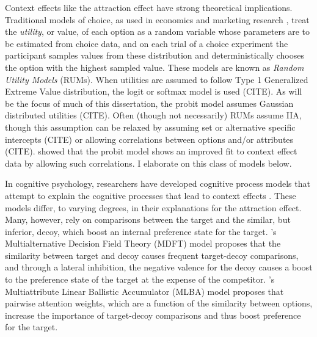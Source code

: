 \documentclass{umassthesis}          %
\begin{document}
Context effects like the attraction effect have strong theoretical implications. Traditional models of choice, as used in economics and marketing research \parencite{mcfadden2001economic}, treat the \textit{utility}, or value, of each option as a random variable whose parameters are to be estimated from choice data, and on each trial of a choice experiment the participant samples values from these distribution and deterministically chooses the option with the highest sampled value. These models are known as \textit{Random Utility Models} (RUMs). When utilities are assumed to follow Type 1 Generalized Extreme Value distribution, the logit or softmax model is used (CITE). As will be the focus of much of this dissertation, the probit model assumes Gaussian distributed utilities (CITE). Often (though not necessarily) RUMs assume IIA, though this assumption can be relaxed by assuming set or alternative specific intercepts (CITE) or allowing correlations between options and/or attributes (CITE). \textcite{haaijer1998utility} showed that the probit model shows an improved fit to context effect data by allowing such correlations. I elaborate on this class of models below. 

In cognitive psychology, researchers have developed cognitive process models that attempt to explain the cognitive processes that lead to context effects \parencite{truebloodMultiattributeLinearBallistic,roeMultialternativeDecisionField2001a,usherLossAversionInhibition2004a,bhatiaAssociationsAccumulationPreference2013b,noguchiMultialternativeDecisionSampling2018a,wollschlager2NaryChoiceTree2012a,bergnerVAMPVotingAgent2019b,tverskyEliminationAspectsTheory1972,tversky1993context}. These models differ, to varying degrees, in their explanations for the attraction effect. Many, however, rely on comparisons between the target and the similar, but inferior, decoy, which boost an internal  preference state for the target. \textcite{roeMultialternativeDecisionField2001a}'s Multialternative Decision Field Theory (MDFT) model proposes that the similarity between target and decoy causes frequent target-decoy comparisons, and through a lateral inhibition, the negative valence for the decoy causes a boost to the preference state of the target at the expense of the competitor. \textcite{truebloodMultiattributeLinearBallistic}'s Multiattribute Linear Ballistic Accumulator (MLBA) model proposes that pairwise attention weights, which are a function of the similarity between options, increase the importance of target-decoy comparisons and thus boost preference for the target. 
\end{document}
